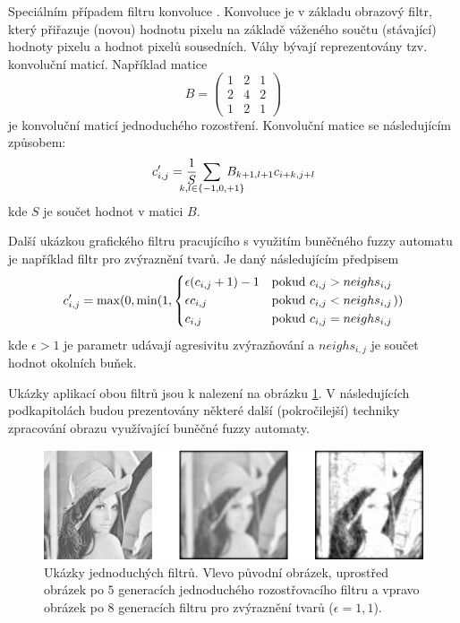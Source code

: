 \documentclass[a4paper,10pt]{article}
\begin{document}
Speciálním případem filtru konvoluce \cite{Rus-ImaProHan}. Konvoluce je v základu obrazový filtr, který přiřazuje (novou) hodnotu pixelu na základě váženého součtu (stávající) hodnoty pixelu a hodnot pixelů sousedních. Váhy bývají reprezentovány tzv. konvoluční maticí. Například matice
$$
  B = \begin{pmatrix}
       1 & 2 & 1 \\
       2 & 4 & 2 \\
       1 & 2 & 1 
      \end{pmatrix}
$$
je konvoluční maticí jednoduchého rozostření. Konvoluční matice se následujícím způsobem:
$$
  c'_{i,j} = \frac{1}{S} \; \sum_{\mathclap{k,l \in \{-1, 0, +1\}}} \; B_{k+1, l+1} c_{i+k, j+l}
$$
kde $S$ je součet hodnot v matici $B$.

Další ukázkou grafického filtru pracujícího s využitím buněčného fuzzy automatu je například filtr pro zvýraznění tvarů. Je daný následujícím předpisem
$$
  c'_{i,j} = \max(0, \min(1, 
    \begin{dcases}
      \epsilon (c_{i,j} + 1) - 1	& \text{pokud $c_{i,j} > neighs_{i,j}$} \\
      \epsilon c_{i,j}			& \text{pokud $c_{i,j} < neighs_{i,j}$} \\
      c_{i,j}	& \text{pokud $c_{i,j} = neighs_{i,j}$} 
    \end{dcases}
    ))
$$
kde $\epsilon > 1$ je parametr udávají agresivitu zvýrazňování a $neighs_{i,j}$ je součet hodnot okolních buňek.

Ukázky aplikací obou filtrů jsou k nalezení na obrázku \ref{img:Filters}. V následujících podkapitolách budou prezentovány některé další (pokročilejší) techniky zpracování obrazu využívající buněčné fuzzy automaty.

\begin{figure}
 \includegraphics[width=\textwidth]{genimg-filters}
 
 \caption{Ukázky jednoduchých filtrů. Vlevo původní obrázek, uprostřed obrázek po $5$ generacích jednoduchého rozostřovacího filtru a vpravo obrázek po $8$ generacích filtru pro zvýraznění tvarů ($\epsilon = 1{,}1$).} \label{img:Filters}
\end{figure}
\end{document}
